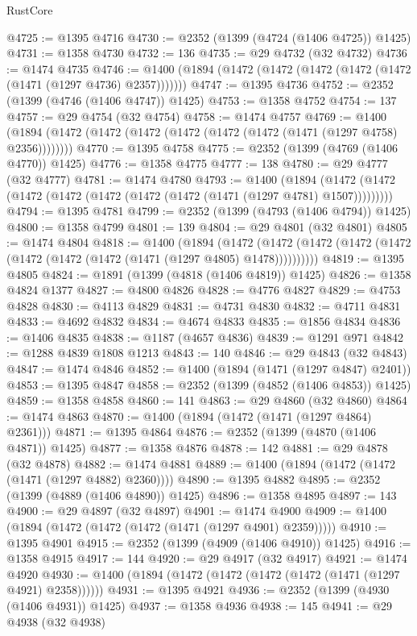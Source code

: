 \begin{lexlean}{RustCore}
\begin{coremodule}
@4725 := @1395 @4716
@4730 := @2352 (@1399 (@4724 (@1406 @4725)) @1425)
@4731 := @1358 @4730
@4732 := 136
@4735 := @29 @4732 (@32 @4732)
@4736 := @1474 @4735
@4746 := @1400 (@1894 (@1472 (@1472 (@1472 (@1472 (@1472 (@1471 (@1297 @4736) @2357)))))))
@4747 := @1395 @4736
@4752 := @2352 (@1399 (@4746 (@1406 @4747)) @1425)
@4753 := @1358 @4752
@4754 := 137
@4757 := @29 @4754 (@32 @4754)
@4758 := @1474 @4757
@4769 := @1400 (@1894 (@1472 (@1472 (@1472 (@1472 (@1472 (@1472 (@1471 (@1297 @4758) @2356))))))))
@4770 := @1395 @4758
@4775 := @2352 (@1399 (@4769 (@1406 @4770)) @1425)
@4776 := @1358 @4775
@4777 := 138
@4780 := @29 @4777 (@32 @4777)
@4781 := @1474 @4780
@4793 := @1400
    (@1894 (@1472 (@1472 (@1472 (@1472 (@1472 (@1472 (@1472 (@1471 (@1297 @4781) @1507)))))))))
@4794 := @1395 @4781
@4799 := @2352 (@1399 (@4793 (@1406 @4794)) @1425)
@4800 := @1358 @4799
@4801 := 139
@4804 := @29 @4801 (@32 @4801)
@4805 := @1474 @4804
@4818 := @1400
    (@1894
      (@1472 (@1472 (@1472 (@1472 (@1472 (@1472 (@1472 (@1472 (@1471 (@1297 @4805) @1478))))))))))
@4819 := @1395 @4805
@4824 := @1891 (@1399 (@4818 (@1406 @4819)) @1425)
@4826 := @1358 @4824 @1377
@4827 := @4800 @4826
@4828 := @4776 @4827
@4829 := @4753 @4828
@4830 := @4113 @4829
@4831 := @4731 @4830
@4832 := @4711 @4831
@4833 := @4692 @4832
@4834 := @4674 @4833
@4835 := @1856 @4834
@4836 := @1406 @4835
@4838 := @1187 (@4657 @4836)
@4839 := @1291 @971
@4842 := @1288 @4839 @1808 @1213
@4843 := 140
@4846 := @29 @4843 (@32 @4843)
@4847 := @1474 @4846
@4852 := @1400 (@1894 (@1471 (@1297 @4847) @2401))
@4853 := @1395 @4847
@4858 := @2352 (@1399 (@4852 (@1406 @4853)) @1425)
@4859 := @1358 @4858
@4860 := 141
@4863 := @29 @4860 (@32 @4860)
@4864 := @1474 @4863
@4870 := @1400 (@1894 (@1472 (@1471 (@1297 @4864) @2361)))
@4871 := @1395 @4864
@4876 := @2352 (@1399 (@4870 (@1406 @4871)) @1425)
@4877 := @1358 @4876
@4878 := 142
@4881 := @29 @4878 (@32 @4878)
@4882 := @1474 @4881
@4889 := @1400 (@1894 (@1472 (@1472 (@1471 (@1297 @4882) @2360))))
@4890 := @1395 @4882
@4895 := @2352 (@1399 (@4889 (@1406 @4890)) @1425)
@4896 := @1358 @4895
@4897 := 143
@4900 := @29 @4897 (@32 @4897)
@4901 := @1474 @4900
@4909 := @1400 (@1894 (@1472 (@1472 (@1472 (@1471 (@1297 @4901) @2359)))))
@4910 := @1395 @4901
@4915 := @2352 (@1399 (@4909 (@1406 @4910)) @1425)
@4916 := @1358 @4915
@4917 := 144
@4920 := @29 @4917 (@32 @4917)
@4921 := @1474 @4920
@4930 := @1400 (@1894 (@1472 (@1472 (@1472 (@1472 (@1471 (@1297 @4921) @2358))))))
@4931 := @1395 @4921
@4936 := @2352 (@1399 (@4930 (@1406 @4931)) @1425)
@4937 := @1358 @4936
@4938 := 145
@4941 := @29 @4938 (@32 @4938)

\end{coremodule}
\end{lexlean}
